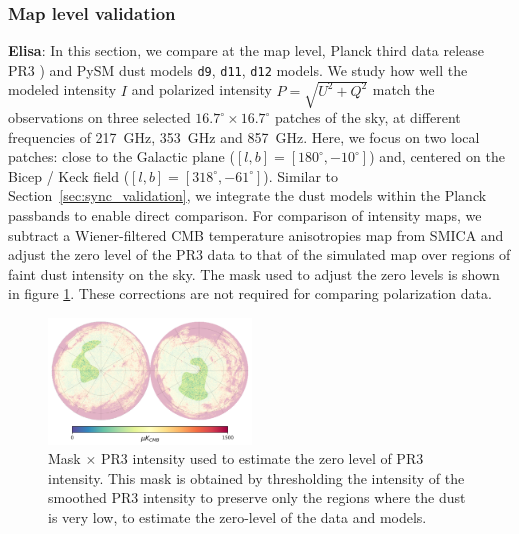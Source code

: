 \documentclass[twocolumn]{aastex631}
\newcommand{\dnine}{{\tt d9}}
\begin{document}
\subsubsection{Map level validation}
\textbf{Elisa}: In this section, we compare at the map level, Planck third data release PR3 \cite{planck2016-l03}) and PySM dust models \dnine{}, {\tt d11}, {\tt d12} models. We study how well the modeled intensity $I$ and polarized intensity $P = \sqrt{U^2 + Q^2}$ match the observations on three selected $16.7^\circ \times 16.7^\circ$ patches of the sky, at different frequencies of 217~GHz, 353~GHz and 857~GHz. Here, we focus on two local patches: close to the Galactic plane ($[l,b] =[180^\circ,-10^\circ]$) and, centered on the Bicep / Keck field ($[l,b] =[318^\circ,-61^\circ]$).
Similar to Section~\ref{sec:sync_validation}, we integrate the dust models within the Planck passbands to enable direct comparison. For comparison of intensity maps, we subtract a Wiener-filtered CMB temperature anisotropies map from SMICA and adjust the zero level of the PR3 data to that of the simulated map over regions of faint dust intensity on the sky.
The mask used to adjust the zero levels is shown in figure \ref{fig:mask_zero_lvl_int}. These corrections are not required for comparing polarization data.
\begin{figure}[ht!]
    \centering
    \includegraphics[width=0.48\textwidth]{figures/mask_intxPR3_zero_lvl.png}
    \caption{Mask $\times$ PR3 intensity used to estimate the zero level of PR3 intensity. This mask is obtained by thresholding the intensity of the smoothed PR3 intensity to preserve only the regions where the dust is very low, to estimate the zero-level of the data and models.}%
    \label{fig:mask_zero_lvl_int}
\end{figure}
\end{document}
